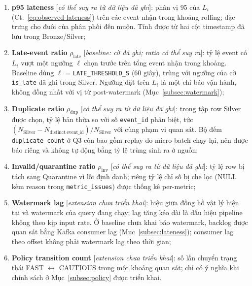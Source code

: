 \begin{enumerate}
  \item \textbf{p95 lateness} [\emph{có thể suy ra từ dữ liệu đã ghi}]:
        phân vị 95 của $L_i$ (Ct.~\ref{eq:observed-lateness}) trên các
        event nhận trong khoảng rolling; đặc trưng cho đuôi của phân phối
        đến muộn. Tính được từ hai cột timestamp đã lưu trong
        Bronze/Silver;
  \item \textbf{Late-event ratio} $\rho_{\mathrm{late}}$ [\emph{baseline:
        cờ đã ghi; ratio có thể suy ra}]: tỷ lệ event có $L_i$ vượt một
        ngưỡng $\ell$ chọn trước trên tổng event nhận trong khoảng.
        Baseline dùng $\ell$ = \texttt{LATE\_THRESHOLD\_S} (60 giây),
        trùng với ngưỡng của cờ \texttt{is\_late} đã ghi trong Silver.
        Ngưỡng đặt trên $L_i$ là một chỉ báo vận hành, không đồng nhất với
        vị từ post-watermark (Mục~\ref{subsec:watermark});
  \item \textbf{Duplicate ratio} $\rho_{\mathrm{dup}}$ [\emph{có thể suy ra
        từ dữ liệu đã ghi}]: trong tập row Silver được chọn, tỷ lệ bản
        thừa so với số \texttt{event\_id} phân biệt, tức
        $(N_{\mathrm{Silver}}-N_{\mathrm{distinct\ event\_id}})
        /N_{\mathrm{Silver}}$ với cùng phạm vi quan sát. Bộ đếm
        \texttt{duplicate\_count} ở Q3 còn bao gồm replay do micro-batch
        chạy lại, nên được báo riêng và không tự động bằng tỷ lệ trùng
        sinh ra ở nguồn;
  \item \textbf{Invalid/quarantine ratio} $\rho_{\mathrm{inv}}$
        [\emph{có thể suy ra từ dữ liệu đã ghi}]: tỷ lệ row bị tách sang
        Quarantine vì lỗi định danh; riêng tỷ lệ chỉ số bị che lọc (NULL
        kèm reason trong \texttt{metric\_issues}) được thống kê
        per-metric;
  \item \textbf{Watermark lag} [\emph{extension chưa triển khai}]: hiệu
        giữa đồng hồ vật lý hiện tại và watermark của query đang chạy;
        lag tăng kéo dài là dấu hiệu pipeline không theo kịp input rate.
        Ở baseline chưa khai báo watermark, backlog được quan sát bằng
        Kafka consumer lag (Mục~\ref{subsec:lateness}); consumer lag theo
        offset không phải watermark lag theo thời gian;
  \item \textbf{Policy transition count} [\emph{extension chưa triển
        khai}]: số lần chuyển trạng thái FAST $\leftrightarrow$ CAUTIOUS
        trong một khoảng quan sát; chỉ có ý nghĩa khi chính sách ở
        Mục~\ref{subsec:policy} được triển khai.
\end{enumerate}

